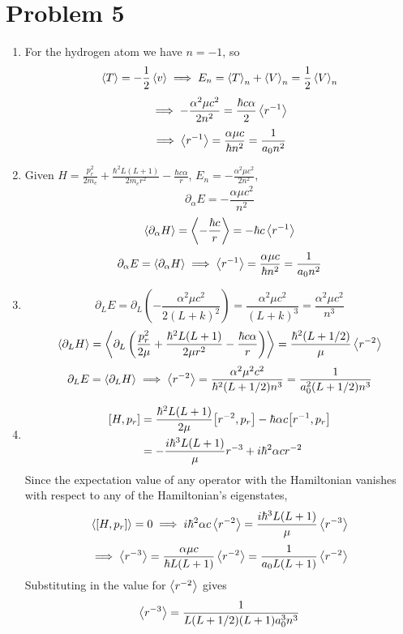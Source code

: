 \documentclass[12pt]{article}
\begin{document}
\section*{Problem 5}
\begin{enumerate}[label=(\alph*)]
    \item For the hydrogen atom we have $n=-1$, so
    \[ \ev{T} = -\frac{1}{2}\ev{v} \implies E_n = \ev{T}_n + \ev{V}_n = \frac{1}{2}\ev{V}_n \]
    \[ \implies -\frac{\alpha^2\mu c^2}{2n^2} = \frac{\hbar c \alpha}{2}\ev{r^{-1}} \]
    \[ \implies \ev{r^{-1}} = \frac{\alpha\mu c}{\hbar n^2} = \frac{1}{a_0n^2} \]

    \item Given $H = \frac{p_r^2}{2m_e} + \frac{\hbar^2L(L+1)}{2m_er^2} - \frac{\hbar c \alpha}{r}$, $E_n = -\frac{\alpha^2\mu c^2}{2n^2}$,
    \[ \partial_\alpha E = -\frac{\alpha\mu c^2}{n^2} \]
    \[ \ev{\partial_\alpha H} = \ev{-\frac{\hbar c}{r}} = -\hbar c \ev{r^{-1}} \]
    \[ \partial_\alpha E = \ev{\partial_\alpha H} \implies \ev{r^{-1}} = \frac{\alpha\mu c}{\hbar n^2} = \frac{1}{a_0 n^2} \]

    \item 
    \[ \partial_L E = \partial_L \left(-\frac{\alpha^2\mu c^2}{2(L+k)^2}\right) = \frac{\alpha^2\mu c^2}{(L+k)^3} = \frac{\alpha^2\mu c^2}{n^3} \]
    \[ \ev{\partial_L H} = \ev{\partial_L \left(\frac{p_r^2}{2\mu} + \frac{\hbar^2L(L+1)}{2\mu r^2} - \frac{\hbar c \alpha}{r}\right)} = \frac{\hbar^2(L + 1/2)}{\mu}\ev{r^{-2}} \]
    \[ \partial_L E = \ev{\partial_L H} \implies \ev{r^{-2}} = \frac{\alpha^2\mu^2 c^2}{\hbar^2(L + 1/2)n^3} = \frac{1}{a_0^2(L + 1/2)n^3}\]

    \item 
    \begin{align*}
        \comm{H}{p_r} &= \frac{\hbar^2L(L+1)}{2\mu}\comm{r^{-2}}{p_r} - \hbar\alpha c\comm{r^{-1}}{p_r} \\
        &= -\frac{i\hbar^3L(L+1)}{\mu}r^{-3} + i\hbar^2\alpha c r^{-2}
    \end{align*}
    Since the expectation value of any operator with the Hamiltonian vanishes with respect to any of the Hamiltonian's eigenstates,
    \[ \ev{\comm{H}{p_r}} = 0 \implies i\hbar^2\alpha c \ev{r^{-2}} = \frac{i\hbar^3L(L+1)}{\mu}\ev{r^{-3}} \]
    \[ \implies \ev{r^{-3}} = \frac{\alpha\mu c}{\hbar L(L+1)}\ev{r^{-2}} = \frac{1}{a_0L(L+1)}\ev{r^{-2}} \] 
    Substituting in the value for $\ev{r^{-2}}$ gives
    \[ \ev{r^{-3}} = \frac{1}{L(L+1/2)(L+1)a_0^3n^3} \]

\end{enumerate}
\end{document}
